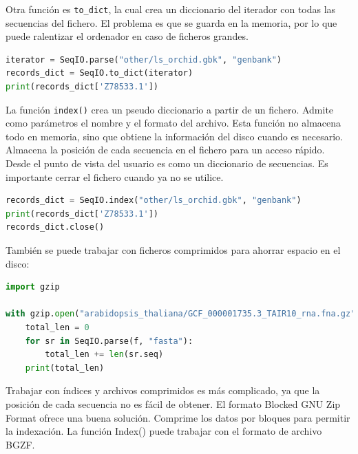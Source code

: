 Otra función es \texttt{to\_dict}, la cual crea un diccionario del iterador con todas las secuencias del fichero. El problema es que se guarda en la memoria, por lo que puede ralentizar el ordenador en caso de ficheros grandes.
\begin{lstlisting}[language=Python]
iterator = SeqIO.parse("other/ls_orchid.gbk", "genbank")
records_dict = SeqIO.to_dict(iterator)
print(records_dict['Z78533.1'])
\end{lstlisting}

La función \texttt{index()} crea un pseudo diccionario a partir de un fichero. Admite como parámetros el nombre y el formato del archivo. Esta función no almacena todo en memoria, sino que obtiene la información del disco cuando es necesario. Almacena la posición de cada secuencia en el fichero para un acceso rápido. Desde el punto de vista del usuario es como un diccionario de secuencias. Es importante cerrar el fichero cuando ya no se utilice.
\begin{lstlisting}[language=Python]
records_dict = SeqIO.index("other/ls_orchid.gbk", "genbank")
print(records_dict['Z78533.1'])
records_dict.close()
\end{lstlisting}

También se puede trabajar con ficheros comprimidos para ahorrar espacio en el disco:
\begin{lstlisting}[language=Python]
import gzip

with gzip.open("arabidopsis_thaliana/GCF_000001735.3_TAIR10_rna.fna.gz", "rt") as f:
    total_len = 0
    for sr in SeqIO.parse(f, "fasta"):
        total_len += len(sr.seq)
    print(total_len)
\end{lstlisting}

Trabajar con índices y archivos comprimidos es más complicado, ya que la posición de cada secuencia no es fácil de obtener. El formato Blocked GNU Zip Format ofrece una buena solución. Comprime los datos por bloques para permitir la indexación. La función Index() puede trabajar con el formato de archivo BGZF.

